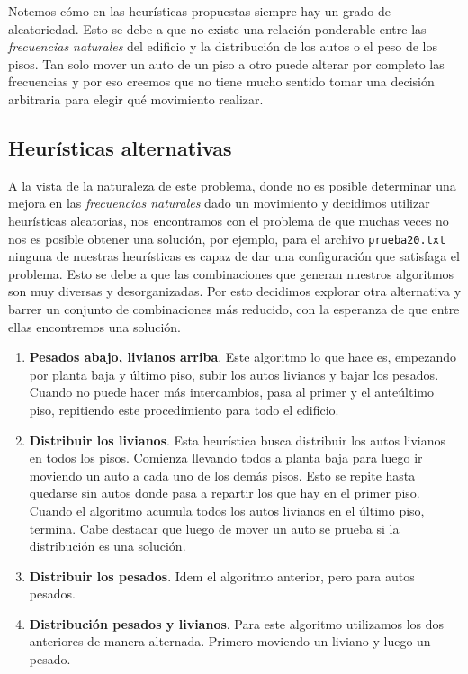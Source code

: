 \documentclass[a4paper]{article}
\begin{document}
Notemos cómo en las heurísticas propuestas siempre hay un grado de aleatoriedad. Esto se debe a que no existe una relación ponderable entre las \textit{frecuencias naturales} del edificio y la  distribución de los autos o el peso de los pisos. Tan solo mover un auto de un piso a otro puede alterar por completo las frecuencias y por eso creemos que no tiene mucho sentido tomar una decisión arbitraria para elegir qué movimiento realizar. 

\subsection{Heurísticas alternativas}

A la vista de la naturaleza de este problema, donde no es posible determinar una mejora en las \textit{frecuencias naturales} dado un movimiento y decidimos utilizar heurísticas aleatorias, nos encontramos con el problema de que muchas veces no nos es posible obtener una solución, por ejemplo, para el archivo \texttt{prueba20.txt} ninguna de nuestras heurísticas es capaz de dar una configuración que satisfaga el problema. Esto se debe a que las combinaciones que generan nuestros algoritmos son muy diversas y desorganizadas. Por esto decidimos explorar otra alternativa y barrer un conjunto de combinaciones más reducido, con la esperanza de que entre ellas encontremos una solución.

\begin{enumerate}
  \item \textbf{Pesados abajo, livianos arriba}. Este algoritmo lo que hace es, empezando por planta baja y último piso, subir los autos livianos y bajar los pesados. Cuando no puede hacer más intercambios, pasa al primer y el anteúltimo piso, repitiendo este procedimiento para todo el edificio.
  \item \textbf{Distribuir los livianos}. Esta heurística busca distribuir los autos livianos en todos los pisos. Comienza llevando todos a planta baja para luego ir moviendo un auto a cada uno de los demás pisos. Esto se repite hasta quedarse sin autos donde pasa a repartir los que hay en el primer piso. Cuando el algoritmo acumula todos los autos livianos en el último piso, termina. Cabe destacar que luego de mover un auto se prueba si la distribución es una solución.
  \item \textbf{Distribuir los pesados}. Idem el algoritmo anterior, pero para autos pesados.
  \item \textbf{Distribución pesados y livianos}. Para este algoritmo utilizamos los dos anteriores de manera alternada. Primero moviendo un liviano y luego un pesado.
\end{enumerate}
\end{document}
